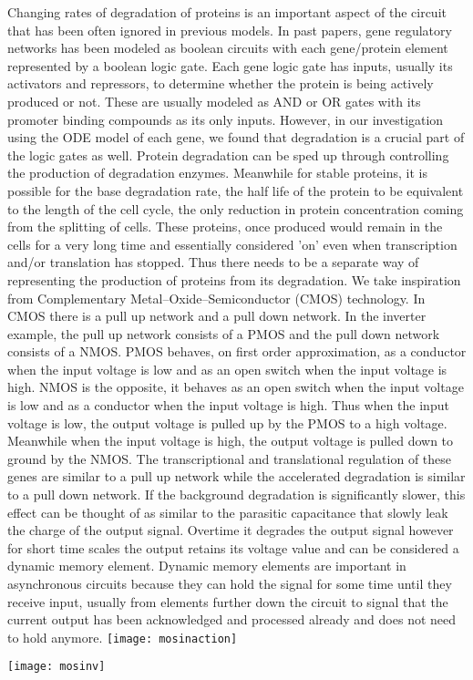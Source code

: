 \documentclass{article}
\begin{document}
Changing rates of degradation of proteins is an important aspect of the circuit that has been often ignored in previous models.  In past papers, gene regulatory networks has been modeled as boolean circuits with each gene/protein element represented by a boolean logic gate.  Each gene logic gate has inputs, usually its activators and repressors, to determine whether the protein is being actively produced or not.  These are usually modeled as AND or OR gates with its promoter binding compounds as its only inputs.  However, in our investigation using the ODE model of each gene, we found that degradation is a crucial part of the logic gates as well.  Protein degradation can be sped up through controlling the production of degradation enzymes.  Meanwhile for stable proteins, it is possible for the base degradation rate, the half life of the protein to be equivalent to the length of the cell cycle, the only reduction in protein concentration coming from the splitting of cells.  These proteins, once produced would remain in the cells for a very long time and essentially considered 'on' even when transcription and/or translation has stopped.  Thus there needs to be a separate way of representing the production of proteins from its degradation.  We take inspiration from Complementary Metal–Oxide–Semiconductor (CMOS) technology.  In CMOS there is a pull up network and a pull down network.  In the inverter example, the pull up network consists of a PMOS and the pull down network consists of a NMOS.  PMOS behaves, on first order approximation, as a conductor when the input voltage is low and as an open switch when the input voltage is high.  NMOS is the opposite, it behaves as an open switch when the input voltage is low and as a conductor when the input voltage is high.  Thus when the input voltage is low, the output voltage is pulled up by the PMOS to a high voltage.  Meanwhile when the input voltage is high, the output voltage is pulled down to ground by the NMOS.  The transcriptional and translational regulation of these genes are similar to a pull up network while the accelerated degradation is similar to a pull down network.  If the background degradation is significantly slower, this effect can be thought of as similar to the parasitic capacitance that slowly leak the charge of the output signal.  Overtime it degrades the output signal however for short time scales the output retains its voltage value and can be considered a dynamic memory element.  Dynamic memory elements are important in asynchronous circuits because they can hold the signal for some time until they receive input, usually from elements further down the circuit to signal that the current output has been acknowledged and processed already and does not need to hold anymore.
\newline \newline
\newline
\texttt{[image: mosinaction]}
\begin{center}
\texttt{[image: mosinv]}
\end{center}
\end{document}
